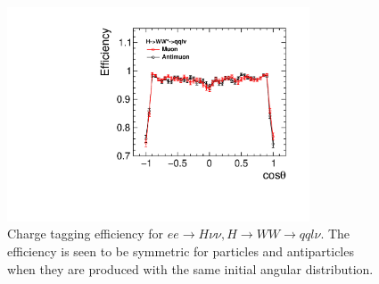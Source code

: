 \begin{figure}
  \centering
  \includegraphics[width=0.8\textwidth]{TopAnalysis/figures/MuonEfficiency_Higgs.pdf}
  \caption[Lepton efficiency for $ee\rightarrow H\nu\nu,H \rightarrow WW\rightarrow qql\nu$ ]{Charge tagging efficiency for $ee\rightarrow H\nu\nu,H \rightarrow WW\rightarrow qql\nu$. The efficiency is seen to be symmetric for particles and antiparticles when they are produced with the same initial angular distribution.}
  \label{fig:higgsleptons}
\end{figure}

